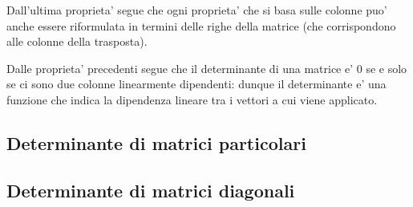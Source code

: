 Dall'ultima proprieta' segue che ogni proprieta' che si basa sulle colonne puo' anche essere riformulata in termini delle righe della matrice (che corrispondono alle colonne della trasposta).

Dalle proprieta' precedenti segue che il determinante di una matrice e' $0$ se e solo se ci sono due colonne linearmente dipendenti: dunque il determinante e' una funzione che indica la dipendenza lineare tra i vettori a cui viene applicato.

\subsection{Determinante di matrici particolari}

\subsection{Determinante di matrici diagonali}

